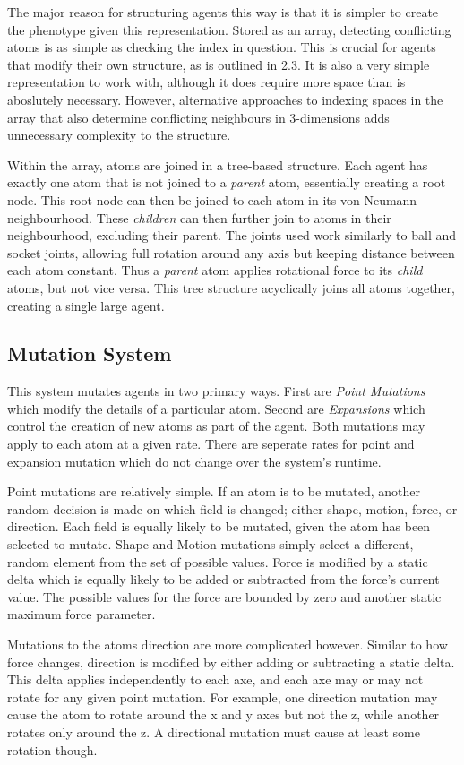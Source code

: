 \documentclass[runningheads]{llncs}
\begin{document}
The major reason for structuring agents this way is that it is simpler to create the phenotype given this representation.
Stored as an array, detecting conflicting atoms is as simple as checking the index in question.
This is crucial for agents that modify their own structure, as is outlined in 2.3.
It is also a very simple representation to work with, although it does require more space than is aboslutely necessary.
However, alternative approaches to indexing spaces in the array that also determine conflicting neighbours in 3-dimensions adds unnecessary complexity to the structure.

Within the array, atoms are joined in a tree-based structure.
Each agent has exactly one atom that is not joined to a \textit{parent} atom, essentially creating a root node.
This root node can then be joined to each atom in its von Neumann neighbourhood.
These \textit{children} can then further join to atoms in their neighbourhood, excluding their parent.
The joints used work similarly to ball and socket joints, allowing full rotation around any axis but keeping distance between each atom constant.
Thus a \textit{parent} atom applies rotational force to its \textit{child} atoms, but not vice versa.
This tree structure acyclically joins all atoms together, creating a single large agent.

\subsection{Mutation System}
This system mutates agents in two primary ways.
First are \textit{Point Mutations} which modify the details of a particular atom.
Second are \textit{Expansions} which control the creation of new atoms as part of the agent.
Both mutations may apply to each atom at a given rate.
There are seperate rates for point and expansion mutation which do not change over the system's runtime.

Point mutations are relatively simple.
If an atom is to be mutated, another random decision is made on which field is changed; either shape, motion, force, or direction.
Each field is equally likely to be mutated, given the atom has been selected to mutate.
Shape and Motion mutations simply select a different, random element from the set of possible values.
Force is modified by a static delta which is equally likely to be added or subtracted from the force's current value.
The possible values for the force are bounded by zero and another static maximum force parameter.

Mutations to the atoms direction are more complicated however.
Similar to how force changes, direction is modified by either adding or subtracting a static delta.
This delta applies independently to each axe, and each axe may or may not rotate for any given point mutation.
For example, one direction mutation may cause the atom to rotate around the x and y axes but not the z, while another rotates only around the z.
A directional mutation must cause at least some rotation though.
\end{document}
